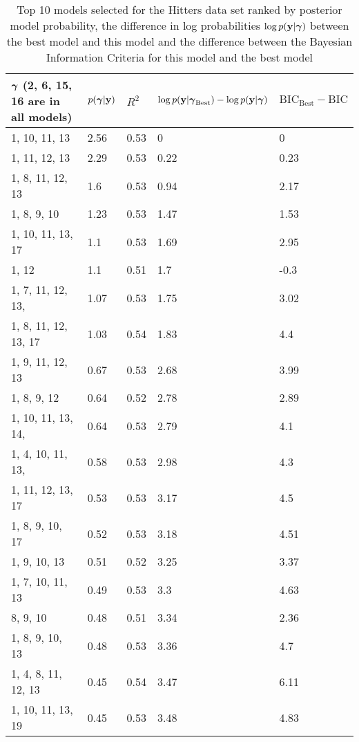 \documentclass{amsart}
\begin{document}
\begin{table}
\label{tab:numerical_results_hitters}
\caption{Top 10 models selected for the Hitters data set ranked by posterior model probability, the difference
					in log probabilities $\log p({\bf y}|{\boldsymbol \gamma})$ between the best model and this model and the difference
					between the Bayesian Information Criteria for this model and the best model}
\begin{tabular}{|l|llll|}
\hline
${\boldsymbol \gamma}$ (2, 6, 15, 16 are in all models) & $p({\boldsymbol \gamma}|{\bf y})$ & $R^2$ & $\log p({\bf y} | {\boldsymbol \gamma}_\text{Best}) - \log p({\bf y} | {\boldsymbol \gamma})$ & $\text{BIC}_\text{Best} - \text{BIC}$ \\
\hline
1, 10, 11, 13&  2.56&  0.53&  0&  0\\
1, 11, 12, 13&  2.29&  0.53&  0.22&  0.23\\
1, 8, 11, 12, 13&  1.6&  0.53&  0.94&  2.17\\
1, 8, 9, 10&  1.23&  0.53&  1.47&  1.53\\
1, 10, 11, 13, 17&  1.1&  0.53&  1.69&  2.95\\
1, 12&  1.1&  0.51&  1.7&  -0.3\\
1, 7, 11, 12, 13,&  1.07&  0.53&  1.75&  3.02\\
1, 8, 11, 12, 13, 17&  1.03&  0.54&  1.83&  4.4\\
1, 9, 11, 12, 13&  0.67&  0.53&  2.68&  3.99\\
1, 8, 9, 12&  0.64&  0.52&  2.78&  2.89\\
1, 10, 11, 13, 14,&  0.64&  0.53&  2.79&  4.1\\
1, 4, 10, 11, 13,&  0.58&  0.53&  2.98&  4.3\\
1, 11, 12, 13, 17&  0.53&  0.53&  3.17&  4.5\\
1, 8, 9, 10, 17&  0.52&  0.53&  3.18&  4.51\\
1, 9, 10, 13&  0.51&  0.52&  3.25&  3.37\\
1, 7, 10, 11, 13&  0.49&  0.53&  3.3&  4.63\\
8, 9, 10&  0.48&  0.51&  3.34&  2.36\\
1, 8, 9, 10, 13&  0.48&  0.53&  3.36&  4.7\\
1, 4, 8, 11, 12, 13&  0.45&  0.54&  3.47&  6.11\\
1, 10, 11, 13, 19&  0.45&  0.53&  3.48&  4.83\\
\hline
\end{tabular}
\end{table}
\end{document}
